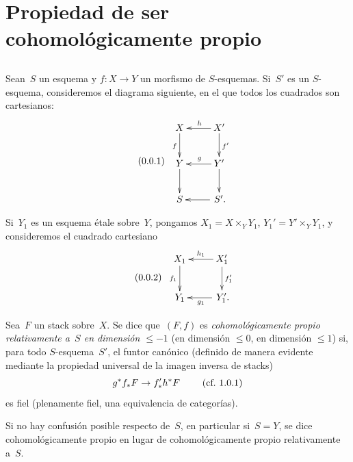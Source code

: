 
\section{Propiedad de ser cohomológicamente propio}
\label{XIII.1}
\setcounter{subsection}{-1}
\subsection{}
\label{XIII.1.0}
Sean~$S$ un esquema y $f \colon X \to Y$ un morfismo de
$S$-esquemas. Si~$S'$ es un $S$-esquema, consideremos el diagrama
siguiente, en el que todos los cuadrados son cartesianos:
\begin{equation*}
\label{eq:XIII.1.0.1}
\tag{\thesubsection.1}
\begin{array}{c}
\xymatrix{ X \ar[d]_f & \ar[l]_h X'
\ar[d]^{f'} \\ Y \ar[d] & \ar[l]_g Y' \ar[d] \\ S & \ar[l] \,S'. }
\end{array}
\end{equation*}

Si~$Y_1$ es un esquema étale sobre~$Y$, pongamos $X_1 =
X \times_Y Y_1$, $Y_1' = Y' \times_Y Y_1$, y consideremos el
cuadrado cartesiano
\begin{equation*}
\label{eq:XIII.1.0.2}
\tag{\thesubsection.2}
\begin{array}{c}
\xymatrix{ X_1 \ar[d]_{f_1} & \ar[l]_{h_1}
X_1' \ar[d]^{f_1'} \\ Y_1 & \ar[l]^{g_1} \,Y_1'. }
\end{array}
\end{equation*}

\begin{definition}
\label{XIII.1.1}
Sea~$F$ un stack sobre~$X$. Se dice que~$(F,f)$ es
\emph{cohomológicamente propio relativamente a~$S$ en dimensión
$\leqslant -1$}
%
%
(\resp en dimensión $\leqslant 0$, \resp en dimensión $\leqslant 1$)
si, para todo $S$-esquema~$S'$, el funtor canónico (definido de manera
evidente mediante la propiedad universal de la imagen inversa de stacks)
$$
g^* f_* F \to f'_* h^* F \qquad\text{ (cf.\ 1.0.1)}
$$
es fiel (\resp plenamente fiel, \resp una equivalencia de categorías).
\end{definition}

Si no hay confusión posible respecto de~$S$, en particular si~$S=Y$, se
dice cohomológicamente propio en lugar de cohomológicamente propio
relativamente a~$S$.

